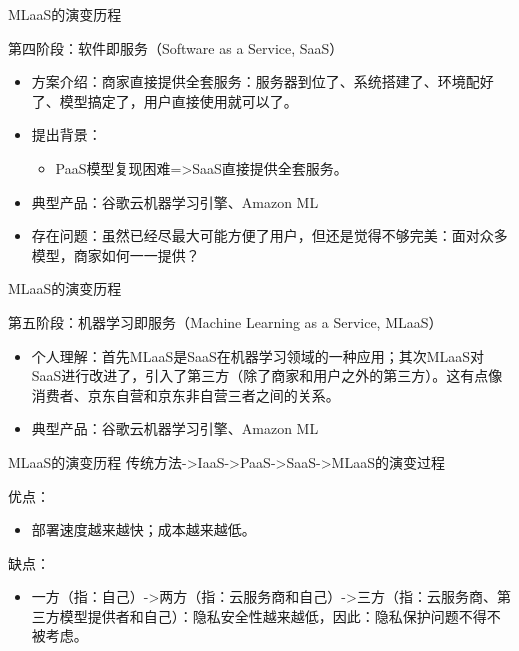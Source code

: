 \documentclass{beamer}
\begin{document}
\begin{frame}{MLaaS的演变历程}
	\begin{exampleblock}{第四阶段：软件即服务（Software as a Service, SaaS）}    \begin{itemize} %
    	\item 方案介绍：商家直接提供全套服务：服务器到位了、系统搭建了、环境配好了、模型搞定了，用户直接使用就可以了。
    	\item 提出背景：
    		\begin{itemize}
				\item PaaS模型复现困难=>SaaS直接提供全套服务。
			\end{itemize}
		\item 典型产品：谷歌云机器学习引擎、Amazon ML
    	\item 存在问题：虽然已经尽最大可能方便了用户，但还是觉得不够完美：面对众多模型，商家如何一一提供？
    \end{itemize}
    \end{exampleblock}
\end{frame}

\begin{frame}{MLaaS的演变历程}
	\begin{exampleblock}{第五阶段：机器学习即服务（Machine Learning as a Service, MLaaS）}
    \begin{itemize} %
    	\item 个人理解：首先MLaaS是SaaS在机器学习领域的一种应用；其次MLaaS对SaaS进行改进了，引入了第三方（除了商家和用户之外的第三方）。这有点像消费者、京东自营和京东非自营三者之间的关系。
    	\item 典型产品：谷歌云机器学习引擎、Amazon ML
    \end{itemize}
    \end{exampleblock}
\end{frame}

\begin{frame}{MLaaS的演变历程}
	传统方法->IaaS->PaaS->SaaS->MLaaS的演变过程
	\begin{exampleblock}{优点：}
    \begin{itemize} %
    	\item 部署速度越来越快；成本越来越低。
    \end{itemize}
    \end{exampleblock}
    \begin{exampleblock}{缺点：}
    \begin{itemize} %
    	\item 一方（指：自己）->两方（指：云服务商和自己）->三方（指：云服务商、第三方模型提供者和自己）：隐私安全性越来越低，因此：隐私保护问题不得不被考虑。
    \end{itemize}
    \end{exampleblock}
\end{frame}
\end{document}
